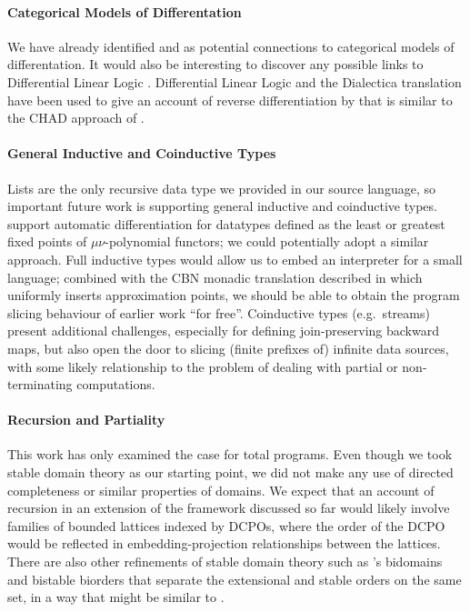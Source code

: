\paragraph{Categorical Models of Differentation} We have already identified  and
 as potential connections to categorical models of differentation. It would also be
interesting to discover any possible links to Differential Linear Logic
\cite{ehrhard_differential_2006}. Differential Linear Logic and the Dialectica translation have been used to
give an account of reverse differentiation by \citet{kerjean-pedrot2024} that is similar to the CHAD approach
of \citet{vakar22}.

\paragraph{General Inductive and Coinductive Types}

Lists are the only recursive data type we provided in our source language, so important future work is
supporting general inductive and coinductive types. \citet{nunes2023} support automatic differentiation for
datatypes defined as the least or greatest fixed points of $\mu\nu$-polynomial functors; we could potentially
adopt a similar approach. Full inductive types would allow us to embed an interpreter for a small language;
combined with the CBN monadic translation described in  which uniformly inserts
approximation points, we should be able to obtain the program slicing behaviour of earlier \GPS work ``for
free''. Coinductive types (e.g.~streams) present additional challenges, especially for defining
join-preserving backward maps, but also open the door to slicing (finite prefixes of) infinite data sources,
with some likely relationship to the problem of dealing with partial or non-terminating computations.

\paragraph{Recursion and Partiality} This work has only examined the case for total programs. Even though we
took stable domain theory as our starting point, we did not make any use of directed completeness or similar
properties of domains. We expect that an account of recursion in an extension of the framework discussed so
far would likely involve families of bounded lattices indexed by DCPOs, where the order of the DCPO would be
reflected in embedding-projection relationships between the lattices. There are also other refinements of
stable domain theory such as \citet{berry79}'s bidomains and \citet{laird07} bistable biorders that separate
the extensional and stable orders on the same set, in a way that might be similar to
.

